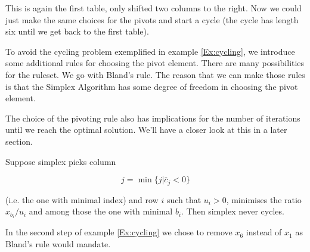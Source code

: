 \begin{Ex}[Cycling]
This is again the first table, only shifted two columns to the right. Now we could just make the same choices for the pivots and start a cycle (the cycle has length six until we get back to the first table).
\end{Ex}

To avoid the cycling problem exemplified in example \ref{Ex:cycling}, we introduce some additional rules for choosing the pivot element. There are many possibilities for the ruleset. We go with Bland's rule. The reason that we can make those rules is that the Simplex Algorithm has some degree of freedom in choosing the pivot element. 

The choice of the pivoting rule also has implications for the number of iterations until we reach the optimal solution. We'll have a closer look at this in a later section.

\begin{thm}\label{Thm:blandsRule} Suppose simplex picks column 

\[j=\min \{j|\bar c_j < 0\}\]

(i.e. the one with minimal index) and row $i$ such that $u_i>0$, minimises the ratio $x_{b_i}/u_i$ and among those the one with minimal $b_i$. Then simplex never cycles.
\end{thm}

In the second step of example \ref{Ex:cycling} we chose to remove $x_6$ instead of $x_1$ as Bland's rule would mandate.

